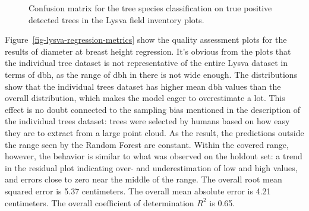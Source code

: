 \begin{figure}
\caption[Confusion matrix for the tree species classification on true positive detected trees]{\label{fig-lysva-confusion-matrix}Confusion matrix for the tree
species classification on true positive detected trees in the Lysva
field inventory plots.}
\end{figure}

Figure~\ref{fig-lysva-regression-metrics} show the quality assessment plots for the results of diameter at breast height regression.
It's obvious from the plots that the individual tree dataset is not representative of the entire Lysva dataset in terms of \gls{dbh}, as the range of \gls{dbh} in there is not wide enough.
The distributions show that the individual trees dataset has higher mean \gls{dbh} values than the overall distribution, which makes the model eager to overestimate a lot.
This effect is no doubt connected to the sampling bias mentioned in the description of the individual trees dataset: trees were selected by humans based on how easy they are to extract from a large point cloud.
As the result, the predictions outside the range seen by the Random Forest are constant.
Within the covered range, however, the behavior is similar to what was observed on the holdout set: a trend in the residual plot indicating over- and underestimation of low and high values, and errors close to zero near the middle of the range.
The overall root mean squared error is 5.37 centimeters.
The overall mean absolute error is 4.21 centimeters.
The overall coefficient of determination $R^2$ is 0.65.

